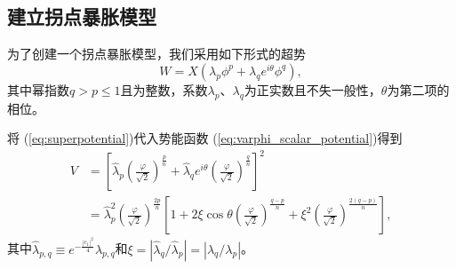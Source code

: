 \subsection{建立拐点暴胀模型}
为了创建一个拐点暴胀模型，我们采用如下形式的超势
\begin{equation}\label{eq:superpotential}
    W = X(\lambda_p\phi^p + \lambda_q e^{i\theta}\phi^q),
\end{equation}
其中幂指数$q > p \le
1$且为整数，系数$\lambda_p$、$\lambda_q$为正实数且不失一般性，$\theta$为第二项的相位。

将 (\ref{eq:superpotential})代入势能函数
(\ref{eq:varphi_scalar_potential})得到
\begin{equation}
\begin{split}
    V &= {\left[ \hat{\lambda}_p {\left(\frac{\varphi}{\sqrt{2}}\right)}^{\frac{p}{n}}
    + \hat{\lambda}_q e^{i\theta}{\left(\frac{\varphi}{\sqrt{2}}\right)}^{\frac{q}{n}}\right]}^2 \\
    &= \hat{\lambda}_p^2 {\left(\frac{\varphi}{\sqrt{2}}\right)}^{\frac{2p}{n}}
    \left[1 + 2\xi\cos\theta {\left(\frac{\varphi}{\sqrt{2}}\right)}^{\frac{q-p}{n}}
    + \xi^2 {\left(\frac{\varphi}{\sqrt{2}}\right)}^{\frac{2(q-p)}{n}}\right],
\end{split}
\end{equation}
其中$\hat{\lambda}_{p,q}\equiv
e^{-\frac{|c_1|^2}{4}}\lambda_{p,q}$和$\xi=|\hat{\lambda}_q/\hat{\lambda}_p|=|\lambda_q/\lambda_p|$。

